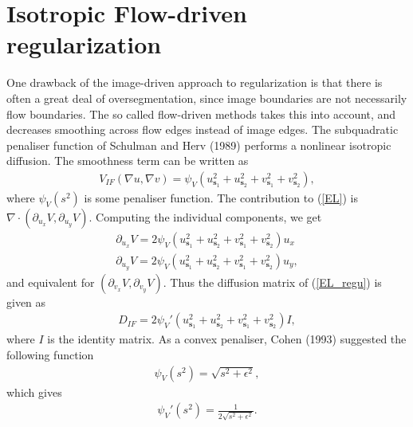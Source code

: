 \documentclass[10pt,a4paper]{article}
\begin{document}
\section{Isotropic Flow-driven regularization}
One drawback of the image-driven approach to regularization is that there is often a great deal of oversegmentation, since image boundaries are not necessarily flow boundaries. The so called flow-driven methods takes this into account, and decreases smoothing across flow edges instead of image edges. The subquadratic penaliser function of Schulman and Herv (1989) performs a nonlinear isotropic diffusion. The smoothness term can be written as
\begin{align*}
V_{IF}(\nabla u, \nabla v) = \psi_V \left( u_{\textbf{s}_1}^2 + u_{\textbf{s}_2}^2 + v_{\textbf{s}_1}^2 + v_{\textbf{s}_2}^2 \right),
\end{align*} 
where $\psi_V(s^2)$ is some penaliser function. The contribution to (\ref{EL}) is $\nabla \cdot (\partial_{u_x} V, \partial_{u_y} V)$. Computing the individual components, we get
\begin{align*}
\partial_{u_x} V = 2 \psi_V \left( u_{\textbf{s}_1}^2 + u_{\textbf{s}_2}^2 + v_{\textbf{s}_1}^2 + v_{\textbf{s}_2}^2 \right) u_x \\
\partial_{u_y} V = 2 \psi_V \left( u_{\textbf{s}_1}^2 + u_{\textbf{s}_2}^2 + v_{\textbf{s}_1}^2 + v_{\textbf{s}_2}^2 \right) u_y,
\end{align*}
and equivalent for $(\partial_{v_x} V, \partial_{v_y} V)$. Thus the diffusion matrix of (\ref{EL_regu}) is given as
\begin{align*}
D_{IF} = 2 \psi_V'\left( u_{\textbf{s}_1}^2 + u_{\textbf{s}_2}^2 + v_{\textbf{s}_1}^2 + v_{\textbf{s}_2}^2 \right) I,
\end{align*}
where $I$ is the identity matrix. As a convex penaliser, Cohen (1993) suggested the following function
\begin{align*}
\psi_V(s^2) = \sqrt{s^2 + \epsilon^2},
\end{align*} 
which gives
\begin{align*}
\psi_V'(s^2) = \frac{1}{2 \sqrt{s^2 + \epsilon^2}}.
\end{align*}
\end{document}
